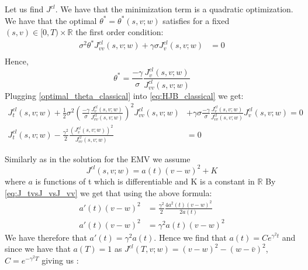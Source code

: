 \documentclass[oneside, a4paper, onecolumn, 11pt]{article}
\begin{document}
Let us find $J^{cl}$.
We have that the minimization term is a quadratic optimization. We have that the optimal $\theta^*= \theta^*(s,v;w)$ satisfies for a fixed $(s,v) \in [0,T)\times \mathbb{R}$ the first order condition: 
\begin{align*}
\sigma^2\theta^* J^{cl}_{vv}(s,v;w) + \gamma\sigma J^{cl}_v(s,v;w) &= 0 \\ 
\end{align*}
Hence,
\begin{equation}
    \theta^* =\frac{-\gamma}{\sigma} \frac{J^{cl}_v(s,v;w)}{J^{cl}_{vv}(s,v;w)} \label{optimal_theta_classical}
\end{equation}
Plugging \eqref{optimal_theta_classical} into \eqref{eq:HJB_classical} we get: 
\begin{align}
J^{cl}_t(s,v;w) + \frac{1}{2}\sigma^2 \left(\frac{-\gamma}{\sigma} \frac{J^{cl}_v(s,v;w)}{J^{cl}_{vv}(s,v;w)}\right)^2 J^{cl}_{vv}(s,v;w) &+ \gamma \sigma \frac{-\gamma}{\sigma} \frac{J^{cl}_v(s,v;w)}{J^{cl}_{vv}(s,v;w)} J^{cl}_v(s,v;w) = 0 \\ 
J^{cl}_t(s,v;w) - \frac{\gamma^2}{2}\frac{(J_v^{cl}(s,v;w))^2}{J^{cl}_{vv}(s,v;w)} &= 0  \label{eq:J_tvsJ_vsJ_vv}
\end{align}


Similarly as in the solution for the EMV we assume $$J^{cl}(s,v;w) = a(t)(v-w)^2 + K$$ where $a$ is functions of t which is differentiable and K is a constant in $\mathbb{R}$ 
By \eqref{eq:J_tvsJ_vsJ_vv} we get that using the above formula:
\begin{align*}
a'(t)(v-w)^2 &= \frac{\gamma^2}{2} \frac{4a^2(t)(v-w)^2}{2a(t)}\\
a'(t)(v-w)^2 &= \gamma^2a(t)(v-w)^2
\end{align*}
We have therefore that $a'(t) = \gamma^2 a(t)$. Hence we find that $ a(t) = C e^{\gamma^2t} $ and since we have that $a(T) =1 $ as $J^{cl}(T,v;w) = (v-w)^2 - (w-\bar{v})^2$, $C = e^{-\gamma^2T}$ giving us :
\end{document}

